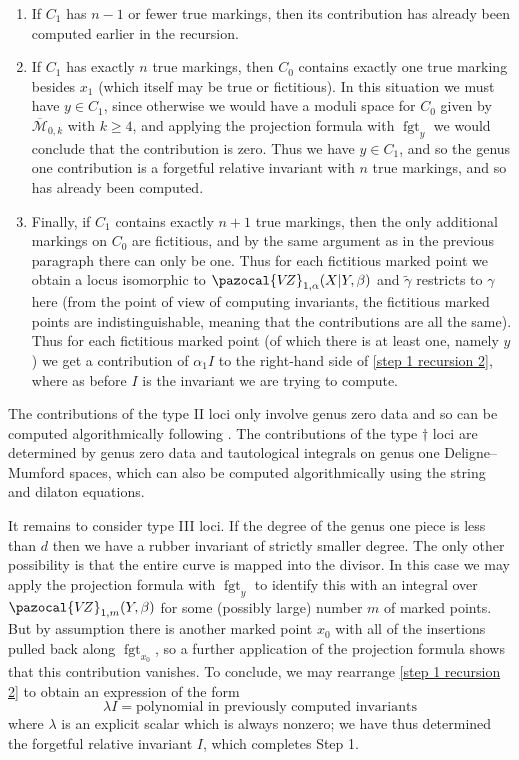 \documentclass[11pt]{amsart}
\newcommand{\VZ}{\pazocal{V\!Z}}
\newcommand{\fgt}{\operatorname{fgt}}
\newcommand{\Mcal}{\mathcal{M}}
\newcommand{\ol}[1]{\overline{#1}}
\theoremstyle{definition}
\theoremstyle{definition}
\begin{document}
\begin{enumerate}
\item If $C_1$ has $n-1$ or fewer true markings, then its contribution has already been computed earlier in the recursion.
\item If $C_1$ has exactly $n$ true markings, then $C_0$ contains exactly one true marking besides $x_1$ (which itself may be true or fictitious). In this situation we must have $y \in C_1$, since otherwise we would have a moduli space for $C_0$ given by $\ol\Mcal_{0,k}$ with $k \geq 4$, and applying the projection formula with $\fgt_y$ we would conclude that the contribution is zero. Thus we have $y \in C_1$, and so the genus one contribution is a forgetful relative invariant with $n$ true markings, and so has already been computed.
\item Finally, if $C_1$ contains exactly $n+1$ true markings, then the only additional markings on $C_0$ are fictitious, and by the same argument as in the previous paragraph there can only be one. Thus for each fictitious marked point we obtain a locus isomorphic to $\VZ_{1,\alpha}(X|Y,\beta)$ and $\tilde\gamma$ restricts to $\gamma$ here (from the point of view of computing invariants, the fictitious marked points are indistinguishable, meaning that the contributions are all the same). Thus for each fictitious marked point (of which there is at least one, namely $y$) we get a contribution of $\alpha_1 I$ to the right-hand side of \eqref{step 1 recursion 2}, where as before $I$ is the invariant we are trying to compute.
\end{enumerate}\medskip
The contributions of the type II loci only involve genus zero data and so can be computed algorithmically following \cite{Ga}. The contributions of the type $\dag$ loci are determined by genus zero data and tautological integrals on genus one Deligne--Mumford spaces, which can also be computed algorithmically using the string and dilaton equations.

It remains to consider type III loci. If the degree of the genus one piece is less than $d$ then we have a rubber invariant of strictly smaller degree. The only other possibility is that the entire curve is mapped into the divisor. In this case we may apply the projection formula with $\fgt_y$ to identify this with an integral over $\VZ_{1,m}(Y,\beta)$ for some (possibly large) number $m$ of marked points. But by assumption there is another marked point $x_0$ with all of the insertions pulled back along $\fgt_{x_0}$, so a further application of the projection formula shows that this contribution vanishes. To conclude, we may rearrange \eqref{step 1 recursion 2} to obtain an expression of the form
\begin{equation*} \lambda I = \text{polynomial in previously computed invariants} \end{equation*}
where $\lambda$ is an explicit scalar which is always nonzero; we have thus determined the forgetful relative invariant $I$, which completes Step 1.
\end{document}
